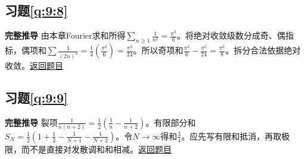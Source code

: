 \subsection*{习题\ref{q:9:8}}\label{a:9:8}\textbf{完整推导} 由本章Fourier求和所得$\sum_{n\ge1}\frac{1}{n^2}=\frac{\pi^2}{6}$。将绝对收敛级数分成奇、偶指标，偶项和$\sum\frac{1}{(2n)^2}=\frac14(\frac{\pi^2}{6})=\frac{\pi^2}{24}$。所以奇项和$\frac{\pi^2}{6}-\frac{\pi^2}{24}=\frac{\pi^2}{8}$。拆分合法依据绝对收敛。\quad\hyperref[q:9:8]{返回题目}

\subsection*{习题\ref{q:9:9}}\label{a:9:9}\textbf{完整推导} 裂项$\frac{1}{n(n+2)}=\frac12(\frac{1}{n}-\frac{1}{n+2})$。有限部分和$S_N=\frac12(1+\frac{1}{2}-\frac{1}{N+1}-\frac{1}{N+2})$。令$N\to\infty$得和$\frac{3}{4}$。应先写有限和抵消，再取极限，而不是直接对发散调和和相减。\quad\hyperref[q:9:9]{返回题目}
